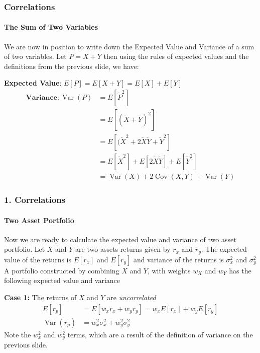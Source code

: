 \documentclass{beamer}
\begin{document}
\begin{foundframe}
    \frametitle{Correlations}
    \framesubtitle{The Sum of Two Variables}

    We are now in position to write down the Expected Value and Variance of a sum of two variables.   Let $P=X+Y$ then using the rules of expected values and the definitions from the previous slide, we have:\\
    \vspace{1em}

    \textbf{Expected Value}: $E[P] = E[X+Y] = E[X] + E[Y]$
    \begin{align*}
     \textbf{Variance}:   \operatorname{Var}(P) &= E[\tilde{P}^2]\\
                &= E[(\tilde{X} + \tilde{Y})^2] \\
                &= E[(\tilde{X}^2 + 2\tilde{X}\tilde{Y} + \tilde{Y}^2]\\
                &= E[\tilde{X}^2] + E[2\tilde{X}\tilde{Y}] + E[\tilde{Y}^2]\\
                &= \operatorname{Var}(X) + 2\operatorname{Cov}(X,Y)+\operatorname{Var}(Y)
    \end{align*}
    

\end{foundframe}

\begin{foundframe}[t]
    \frametitle{1. Correlations}
    \framesubtitle{Two Asset Portfolio}

    Now we are ready to calculate the expected value and variance of two asset portfolio.  Let $X$ and $Y$ are two assets returns given by $r_x$ and $r_y$.   The expected value of the returns is $E[r_x]$ and $E[r_y]$ and variance of the returns is $\sigma_x^2$ and $\sigma_y^2$\\
    \vspace{1em}
    A portfolio constructed by combining $X$ and $Y$, with weights $w_X$ and $w_Y$ has the following expected value and variance \\
    \vspace{1em}
    
    \textbf{Case 1:} The returns of $X$ and $Y$ are \textit{uncorrelated}
    \begin{align*}
        E[r_p] &= E[w_xr_x + w_yr_y] = w_xE[r_x] + w_yE[r_y]\\
        \operatorname{Var}(r_p) &= w_x^2\sigma_x^2 + w_y^2\sigma_y^2
    \end{align*}
    Note the $w_x^2$ and $w_y^2$ terms, which are a result of the definition of variance on the previous slide.

\end{foundframe}
\end{document}
